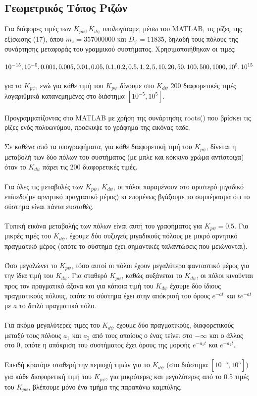 \documentclass{article}
\begin{document}
\subsection{Γεωμετρικός Τόπος Ριζών}
Για διάφορες τιμές των \(K_{p\psi}, K_{d\psi}\) υπολογίσαμε, μέσω του MATLAB, τις ρίζες της εξίσωσης (17), όπου \(m_z = 357000000\) και \(D_\psi = 11835\), δηλαδή τους πόλους της συνάρτησης μεταφοράς του γραμμικού συστήματος. Χρησιμοποιήθηκαν οι τιμές:\\\\ \(10^{-15}, 10^{-5}, 0.001, 0.005, 0.01, 0.05, 0.1, 0.2, \\0.5, 1, 2, 5, 10, 20, 50, 100, 500, 1000, 10^5, 10^{15}\)
\\\\για το \(K_{p\psi}\), ενώ για κάθε τιμή του \(K_{p\psi}\) δίνουμε στο \(K_{d\psi}\) 200 διαφορετικές τιμές λογαριθμικά κατανεμημένες στο διάστημα \([10^{-5}, 10^{5}]\).
\\\\Προγραμματίζοντας στο MATLAB με χρήση της συνάρτησης roots() που βρίσκει τις ρίζες ενός πολυωνύμου, προέκυψε το γράφημα της εικόνας ταδε.
\\\\Σε καθένα από τα υπογραφήματα, για κάθε διαφορετική τιμή του \(K_{p\psi}\), δίνεται η μεταβολή των δύο πόλων του συστήματος (με μπλε και κόκκινο χρώμα αντίστοιχα) όταν το \(K_{d\psi}\) πάρει τις 200 διαφορετικές τιμές.
\\\\Για όλες τις μεταβολές των \(K_{p\psi}\), \(K_{d\psi}\), οι πόλοι παραμένουν στο αριστερό μιγαδικό επίπεδο(με αρνητικό πραγματικό μέρος) κι επομένως βγάζουμε το συμπέρασμα ότι το σύστημα είναι πάντα ευσταθές.
\\\\Τυπική εικόνα μεταβολής των πόλων είναι αυτή του γραφήματος για \(K_{p\psi} = 0.5\). Για μικρές τιμές του \(K_{d\psi}\), έχουμε δύο συζυγείς μιγαδικούς πόλους με μικρό αρνητικό πραγματικό μέρος (οπότε το σύστημα έχει σημαντικές ταλαντώσεις που μειώνονται). \\\\Όσο μεγαλώνει το \(K_{p\psi}\), τόσο αυτοί οι πόλοι έχουν μεγαλύτερο φανταστικό μέρος για την ίδια τιμή του \(K_{d\psi}\). Για σταθερό \(K_{p\psi}\), καθώς αυξάνεται το \(K_{d\psi}\), οι πόλοι κινούνται προς τον πραγματικό άξονα και για κάποια τιμή του \(K_{d\psi}\) έχουμε δύο ίδιους πραγματικούς πόλους, οπότε το σύστημα έχει στην απόκρισή του όρους \(e^{-at}\) και \(te^{-at}\) με \(a\) το διπλό πραγματικό πόλο. \\\\Για ακόμα μεγαλύτερες τιμές του \(K_{d\psi}\) έχουμε δύο πραγματικούς, διαφορετικούς μεταξύ τους πόλους \(a_1\) και \(a_2\) από τους οποίους ο ένας τείνει στο \(-\infty\) και ο άλλος στο 0, οπότε η απόκριση του συστήματος έχει όρους της μορφής \(e^{-a_1t}\) και \(e^{-a_2t}\).\\\\Επειδή κρατάμε σταθερή την περιοχή τιμών για το \(K_{d\psi}\) (στο διάστημα \([10^{-5}, 10^{5}]\)) για κάθε διαφορετική τιμή του \(K_{p\psi}\), για μικρότερες και μεγαλύτερες από το 0.5 τιμές του  \(K_{p\psi}\), βλέπουμε μόνο ένα τμήμα της παραπάνω καμπύλης.
\end{document}
